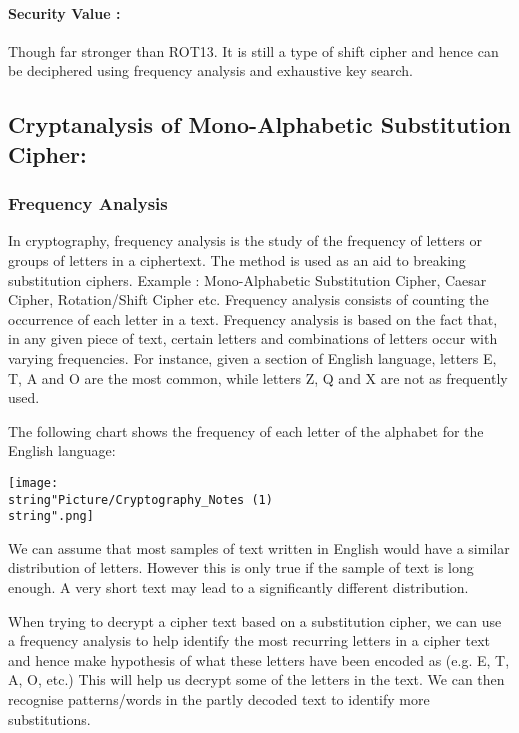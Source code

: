 \documentclass[british]{article}
\begin{document}
\paragraph*{Security Value : }

Though far stronger than ROT13. It is still a type of shift cipher
and hence can be deciphered using frequency analysis and exhaustive
key search.

\vfill{}


\subsection{Cryptanalysis of Mono-Alphabetic Substitution Cipher:}

\subsubsection{Frequency Analysis}

In cryptography, frequency analysis is the study of the frequency
of letters or groups of letters in a ciphertext. The method is used
as an aid to breaking substitution ciphers. Example : Mono-Alphabetic
Substitution Cipher, Caesar Cipher, Rotation/Shift Cipher etc. Frequency
analysis consists of counting the occurrence of each letter in a text.
Frequency analysis is based on the fact that, in any given piece of
text, certain letters and combinations of letters occur with varying
frequencies. For instance, given a section of English language, letters
E, T, A and O are the most common, while letters Z, Q and X are not
as frequently used.

\medskip{}

\begin{center}
The following chart shows the frequency of each letter of the alphabet
for the English language: 
\par\end{center}

\begin{center}
\texttt{[image: \\string"Picture/Cryptography\_Notes (1)\\string".png]} 
\par\end{center}

\medskip{}

We can assume that most samples of text written in English would have
a similar distribution of letters. However this is only true if the
sample of text is long enough. A very short text may lead to a significantly
different distribution.

When trying to decrypt a cipher text based on a substitution cipher,
we can use a frequency analysis to help identify the most recurring
letters in a cipher text and hence make hypothesis of what these letters
have been encoded as (e.g. E, T, A, O, etc.) This will help us decrypt
some of the letters in the text. We can then recognise patterns/words
in the partly decoded text to identify more substitutions.
\end{document}

